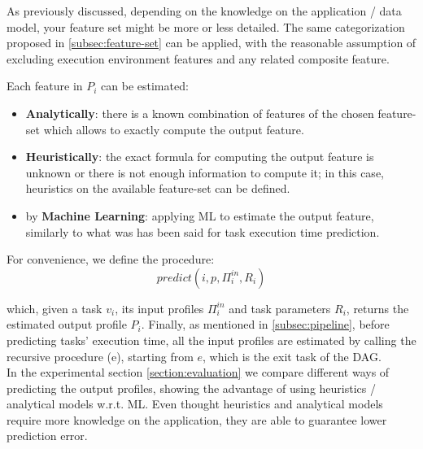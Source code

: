 \documentclass[a4paper, 10pt, conference]{ieeeconf}      %
\begin{document}
\noindent As previously discussed, depending on the knowledge on the application / data model, your feature set might be more or less detailed.
The same categorization proposed in  \ref{subsec:feature-set} can be applied, with the reasonable assumption of excluding execution environment features and any related composite feature.

Each feature in $P_i$ can be estimated:
\begin{itemize}
    \item \textbf{Analytically}: there is a known combination of features of the chosen feature-set which allows to exactly compute the output feature.
    \item \textbf{Heuristically}: the exact formula for computing the output feature is unknown or there is not enough information to compute it; in this case,  heuristics on the available feature-set can be defined.
    \item by \textbf{Machine Learning}: applying ML to estimate the output feature, similarly to what was has been said  for task execution time prediction.
\end{itemize}

\noindent For convenience, we define the procedure:
\begin{equation}
\label{eq:predict}
predict(i, p, \Pi_i^{in}, R_i)
\end{equation}

\noindent which, given a task $v_i$, its input profiles $\Pi_i^{in}$ and task parameters $R_i$, returns the estimated output profile $P_i$.
Finally, as mentioned in \ref{subsec:pipeline}, before predicting tasks' execution time, all the input profiles are  estimated by calling the recursive procedure (e), starting from $e$, which is the exit task of the DAG.\\
\color{blue}
In the experimental section \ref{section:evaluation} we compare different ways of predicting the output profiles, showing the advantage of using heuristics / analytical models w.r.t. ML. 
Even thought heuristics and analytical models require more knowledge on the application, they are able to guarantee lower prediction error.
\color{black}
\end{document}
